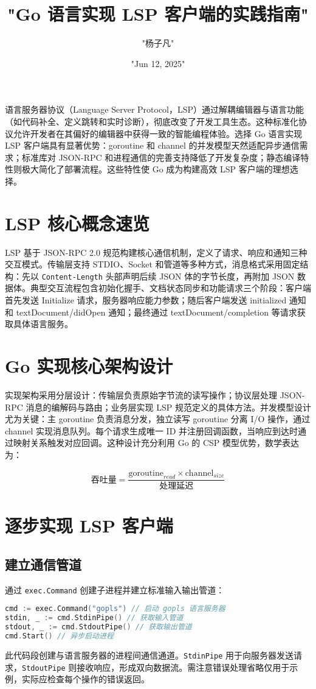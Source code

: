 \title{"Go 语言实现 LSP 客户端的实践指南"}
\author{"杨子凡"}
\date{"Jun 12, 2025"}
\maketitle
语言服务器协议（Language Server Protocol，LSP）通过解耦编辑器与语言功能（如代码补全、定义跳转和实时诊断），彻底改变了开发工具生态。这种标准化协议允许开发者在其偏好的编辑器中获得一致的智能编程体验。选择 Go 语言实现 LSP 客户端具有显著优势：goroutine 和 channel 的并发模型天然适配异步通信需求；标准库对 JSON-RPC 和进程通信的完善支持降低了开发复杂度；静态编译特性则极大简化了部署流程。这些特性使 Go 成为构建高效 LSP 客户端的理想选择。\par
\chapter{LSP 核心概念速览}
LSP 基于 JSON-RPC 2.0 规范构建核心通信机制，定义了请求、响应和通知三种交互模式。传输层支持 STDIO、Socket 和管道等多种方式，消息格式采用固定结构：先以 \texttt{Content-Length} 头部声明后续 JSON 体的字节长度，再附加 JSON 数据体。典型交互流程包含初始化握手、文档状态同步和功能请求三个阶段：客户端首先发送 Initialize 请求，服务器响应能力参数；随后客户端发送 initialized 通知和 textDocument/didOpen 通知；最终通过 textDocument/completion 等请求获取具体语言服务。\par
\chapter{Go 实现核心架构设计}
实现架构采用分层设计：传输层负责原始字节流的读写操作；协议层处理 JSON-RPC 消息的编解码与路由；业务层实现 LSP 规范定义的具体方法。并发模型设计尤为关键：主 goroutine 负责消息分发，独立读写 goroutine 分离 I/O 操作，通过 channel 实现消息队列。每个请求生成唯一 ID 并注册回调函数，当响应到达时通过映射关系触发对应回调。这种设计充分利用 Go 的 CSP 模型优势，数学表达为：\par
$$ \text{吞吐量} = \frac{\text{goroutine}_{read} \times \text{channel}_{size}}{\text{处理延迟}} $$\par
\chapter{逐步实现 LSP 客户端}
\section{建立通信管道}
通过 \texttt{exec.Command} 创建子进程并建立标准输入输出管道：\par
\begin{lstlisting}[language=go]
cmd := exec.Command("gopls") // 启动 gopls 语言服务器
stdin, _ := cmd.StdinPipe() // 获取输入管道
stdout, _ := cmd.StdoutPipe() // 获取输出管道
cmd.Start() // 异步启动进程
\end{lstlisting}
此代码段创建与语言服务器的进程间通信通道。\texttt{StdinPipe} 用于向服务器发送请求，\texttt{StdoutPipe} 则接收响应，形成双向数据流。需注意错误处理省略仅用于示例，实际应检查每个操作的错误返回。\par
